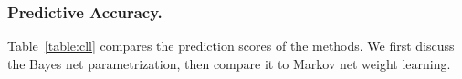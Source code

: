 \documentclass{article}
\begin{document}
%
\subsubsection{Predictive Accuracy.} Table~\ref{table:cll} compares the prediction scores of the methods.
We first discuss the Bayes net parametrization, then compare it to Markov net weight learning.
\end{document}
